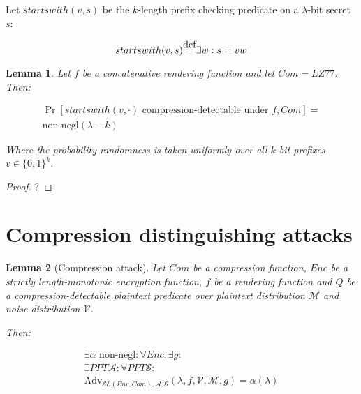 \documentclass{sig-alternate-05-2015}
\newtheorem{lemma}{Lemma}
\newcommand\defeq{\stackrel{\mathclap{\normalfont\mbox{def}}}{=}}
\begin{document}
Let $startswith(v, s)$ be the $k$-length prefix checking predicate on a
$\lambda$-bit secret $s$:

\begin{equation*}
    startswith(v, s) \defeq \exists w: s = v w
\end{equation*}

\begin{lemma}

Let $f$ be a concatenative rendering function and let $Com = LZ77$. Then:

\begin{align*}
\Pr[startswith(v, \cdot) \textrm{ compression-detectable under } f, Com] =\\ \text{non-negl}(\lambda - k)
\end{align*}

Where the probability randomness is taken uniformly over all $k$-bit prefixes $v \in \{0, 1\}^k$.

\end{lemma}

\begin{proof}
?
\end{proof}

\section{Compression distinguishing attacks}\label{sec:comattack}

\begin{lemma}[Compression attack]

Let $Com$ be a compression function, $Enc$ be a strictly length-monotonic
encryption function, $f$ be a rendering function and $Q$ be a
compression-detectable plaintext predicate over plaintext distribution
$\mathcal{M}$ and noise distribution $\mathcal{V}$.

Then:

\begin{align*}
    \exists \alpha \text{ non-negl}:
    \forall Enc:
    \exists g:\\
    \exists PPT \mathcal{A}:
    \forall PPT \mathcal{S}:\\
    \text{Adv}_{\mathcal{SE}(Enc, Com), \mathcal{A}, \mathcal{S}}
    (\lambda, f, \mathcal{V}, \mathcal{M}, g) = \alpha(\lambda)
\end{align*}

\end{lemma}
\end{document}
